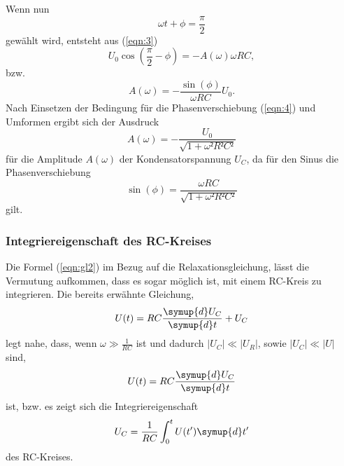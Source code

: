 Wenn nun
\begin{equation}
  \omega t + \phi = \frac{\pi}{2}
\end{equation}
gewählt wird, entsteht aus (\ref{eqn:3})
\begin{equation}
  U_0\cos(\frac{\pi}{2} - \phi) = -A(\omega)\omega RC,
\end{equation}
bzw.
\begin{equation}
  A(\omega) = -\frac{\sin(\phi)}{\omega RC}U_0.
\end{equation}
Nach Einsetzen der Bedingung für die Phasenverschiebung (\ref{eqn:4}) und Umformen ergibt sich der Ausdruck
\begin{equation}
  A(\omega) = -\frac{U_0}{\sqrt{1+\omega²R²C²}} \label{fuck1}
\end{equation}
für die Amplitude $A(\omega)$ der Kondensatorspannung $U_C$, da für den Sinus die Phasenverschiebung
\begin{equation}
  \sin(\phi) = \frac{\omega RC}{\sqrt{1 + \omega² R²C²}} \label{fuck2}
\end{equation}
gilt.\\
\subsubsection{Integriereigenschaft des RC-Kreises}
Die Formel (\ref{eqn:gl2}) im Bezug auf die Relaxationsgleichung, lässt die Vermutung aufkommen, dass es sogar möglich ist, mit einem RC-Kreis zu integrieren.
Die bereits erwähnte Gleichung,
\begin{equation}
  U(t) = RC\frac{\symup{d} U_C}{\symup{d} t} + U_C
\end{equation}
legt nahe, dass, wenn $\omega \gg \frac{1}{RC}$ ist und dadurch $|U_C| \ll |U_R|$, sowie $|U_C| \ll |U|$ sind,
\begin{equation}
  U(t) = RC\frac{\symup{d} U_C}{\symup{d} t}
\end{equation}
ist, bzw. es zeigt sich die Integriereigenschaft
\begin{equation}
  U_C = \frac{1}{RC}\int_0^t U(t')\symup{d}t'
\end{equation}
des RC-Kreises.
